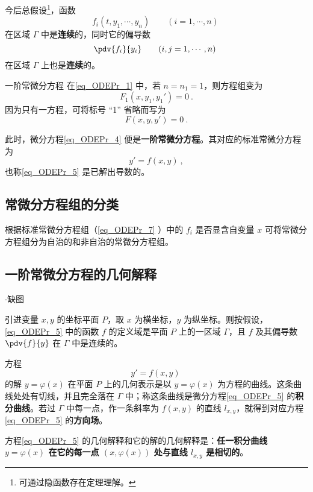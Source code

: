 今后总假设\footnote{可通过隐函数存在定理理解。}，函数 
\begin{equation}
f_i(t,y_1,\cdots,y_n)\qquad (i=1,\cdots,n)~
\end{equation}
在区域 $\Gamma$ 中是\textbf{连续}的，同时它的偏导数
\begin{equation}
\pdv{f_i}{y_i}\qquad (i,j=1,\cdots,n)~
\end{equation}
在区域 $\Gamma$ 上也是\textbf{连续}的。
\begin{example}{一阶常微分方程}
在\autoref{eq_ODEPr_1} 中，若 $n=n_1=1$，则方程组变为
\begin{equation}\label{eq_ODEPr_3}
F_1(x,y_1,y_1')=0~.
\end{equation}
因为只有一方程，可将标号 “1” 省略而写为
\begin{equation}\label{eq_ODEPr_4}
F(x,y,y')=0~.
\end{equation}

此时，微分方程\autoref{eq_ODEPr_4} 便是\textbf{一阶常微分方程}。其对应的标准常微分方程为
\begin{equation}\label{eq_ODEPr_5}
y'=f(x,y)~,
\end{equation}
也称\autoref{eq_ODEPr_5} 是已解出导数的。
\end{example}
\subsection{常微分方程组的分类}
根据标准常微分方程组（\autoref{eq_ODEPr_7} ）中的 $f_i$ 是否显含自变量 $x$ 可将常微分方程组分为自治的和非自治的常微分方程组。

\subsection{一阶常微分方程的几何解释}
\begin{issues}
$\cdot$缺图
\end{issues}

引进变量 $x,y$ 的坐标平面 $P$，取 $x$ 为横坐标，$y$ 为纵坐标。则按假设，\autoref{eq_ODEPr_5} 中的函数 $f$ 的定义域是平面 $P$ 上的一区域 $\Gamma$，且 $f$ 及其偏导数 $\pdv{f}{y}$ 在 $\Gamma$ 中是连续的。

方程
\begin{equation}
y'=f(x,y)~
\end{equation}
的解 $y=\varphi(x)$ 在平面 $P$ 上的几何表示是以 $y=\varphi(x)$ 为方程的曲线。这条曲线处处有切线，并且完全落在 $\Gamma$ 中；称这条曲线是微分方程\autoref{eq_ODEPr_5} 的\textbf{积分曲线}。若过 $\Gamma$ 中每一点，作一条斜率为 $f(x,y)$ 的直线 $l_{x,y}$，就得到对应方程\autoref{eq_ODEPr_5} 的\textbf{方向场}。

方程\autoref{eq_ODEPr_5} 的几何解释和它的解的几何解释是：\textbf{任一积分曲线 $y=\varphi(x)$ 在它的每一点 $(x,\varphi(x))$ 处与直线 $l_{x,y}$ 是相切的}。
